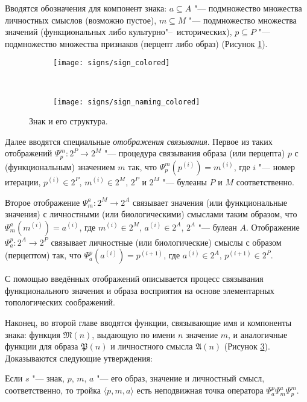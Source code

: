 Вводятся обозначения для компонент знака:  $a\subseteq A$ "--- подмножество множества личностных смыслов (возможно пустое), $m\subseteq M$ "--- подмножество множества значений (функциональных либо культурно"--~исторических), $p\subseteq P$ "--- подмножество множества признаков (перцепт либо образ) (Рисунок \ref{fg:sign}).
\begin{figure}[h]
	\centering
	\begin{subfigure}[b]{0.45\textwidth}
		\texttt{[image: signs/sign\_colored]}
		\caption{}
		\label{fg:sign}
	\end{subfigure}
	~
	\begin{subfigure}[b]{0.45\textwidth}
		\texttt{[image: signs/sign\_naming\_colored]}
		\caption{}
		\label{fg:sign_naming}
	\end{subfigure}
	\caption{Знак и его структура.}
\end{figure}

Далее вводятся специальные \textit{отображения связывания}. Первое из таких отображений $\Psi_p^m:2^P\rightarrow 2^M$ "--- процедура связывания образа (или перцепта) $p$ с (функциональным) значением $m$ так, что $\Psi_p^m(p^{(i)})=m^{(i)}$, где $i$ "--- номер итерации, $p^{(i)}\in 2^P$, $m^{(i)}\in 2^M$, $2^P$ и $2^M$ "--- булеаны $P$ и $M$ соответственно.

Второе отображение $\Psi_m^a:2^M\rightarrow 2^A$ связывает значения (или функциональные значения) с личностными (или биологическими) смыслами таким образом, что $\Psi_m^a(m^{(i)})=a^{(i)}$, где $m^{(i)}\in 2^M$, $a^{(i)}\in 2^A$, $2^A$ "--- булеан $A$. Отображение $\Psi_a^p:2^A\rightarrow 2^P$ связывает личностные (или биологические) смыслы с образом (перцептом) так, что $\Psi_a^p(a^{(i)})=p^{(i+1)}$, где $a^{(i)}\in 2^A$, $p^{(i+1)}\in 2^P$.

С помощью введённых отображений описывается процесс связывания функционального значения и образа восприятия на основе элементарных топологических соображений.

Наконец, во второй главе вводятся функции, связывающие имя и компоненты знака: функция $\mathfrak M(n)$, выдающую по имени $n$ значение $m$, и аналогичные функции для образа $\mathfrak P(n)$ и личностного смысла $\mathfrak A(n)$ (Рисунок \ref{fg:sign_naming}). Доказываются следующие утверждения:

\begin{Pred}
	\label{pred:fixed_point}
	Если $s$ "--- знак, $p$, $m$, $a$ "--- его образ, значение и личностный смысл, соответственно, то тройка $\langle p,m,a\rangle$ есть неподвижная точка оператора $\Psi_a^p\Psi_m^a\Psi_p^m$.
\end{Pred}

